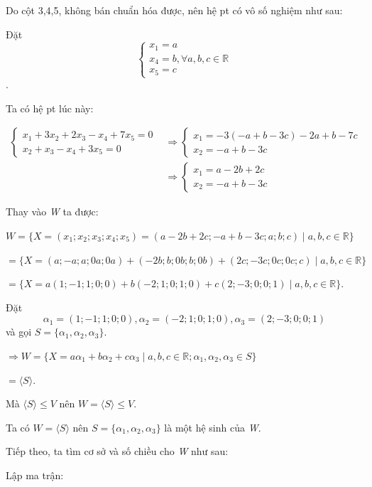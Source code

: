 \documentclass[12pt,a4paper]{article}
\begin{document}
Do cột 3,4,5, không bán chuẩn hóa được, nên hệ pt có vô số nghiệm như
sau:

Đặt \[\begin{cases} x_1 = a \\ x_4 = b, \forall a, b, c \in \mathbb{R} \\ x_5 = c \end{cases}\].

Ta có hệ pt lúc này:

\begin{align*}
\begin{cases} x_1 + 3x_2 + 2x_3 - x_4 + 7x_5 = 0 \\ x_2 + x_3 - x_4 + 3x_5 = 0 \end{cases} 
&\Rightarrow \begin{cases} x_1 = -3(-a+b-3c) - 2a + b - 7c \\ x_2 = -a + b - 3c \end{cases} \\
&\Rightarrow \begin{cases} x_1 = a - 2b + 2c \\ x_2 = -a + b - 3c \end{cases}
\end{align*}

Thay vào \emph{W} ta được:

$W = \{ X = (x_1; x_2; x_3; x_4; x_5) = (a - 2b + 2c; -a + b - 3c; a; b; c) \mid a, b, c \in \mathbb{R} \}$

$= \{ X = (a; -a; a; 0a; 0a) + (-2b; b; 0b; b; 0b) + (2c; -3c; 0c; 0c; c) \mid a, b, c \in \mathbb{R} \}$

$= \{ X = a(1; -1; 1; 0; 0) + b(-2; 1; 0; 1; 0) + c(2; -3; 0; 0; 1) \mid a, b, c \in \mathbb{R} \}$.

Đặt
\[ \alpha_1 = (1; -1; 1; 0; 0), \alpha_2 = (-2; 1; 0; 1; 0), \alpha_3 = (2; -3; 0; 0; 1) \]
và gọi $S = \{ \alpha_1, \alpha_2, \alpha_3 \}$.

$\Rightarrow W = \{ X = a\alpha_1 + b\alpha_2 + c\alpha_3 \mid a, b, c \in \mathbb{R}; \alpha_1, \alpha_2, \alpha_3 \in S \}$

$= \langle S \rangle$.

Mà $\langle S \rangle \le V$ nên
$W = \langle S \rangle \le V$.

Ta có $W = \langle S \rangle$ nên
$S = \{ \alpha_1, \alpha_2, \alpha_3 \}$ là một hệ sinh của
\emph{W}.

Tiếp theo, ta tìm cơ sở và số chiều cho \emph{W} như sau:

Lập ma trận:
\end{document}
